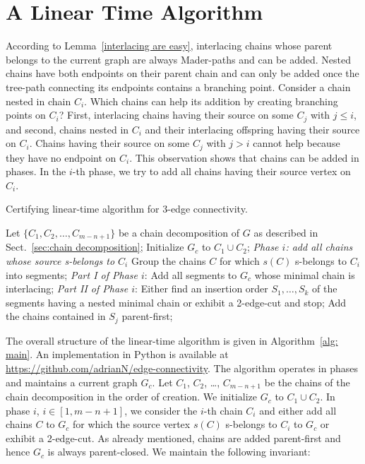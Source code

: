 \documentclass[paper=a4]{scrartcl}
\begin{document}
\section{A Linear Time Algorithm}\label{sec:linear time alg}


According to Lemma~\ref{interlacing are easy}, interlacing chains whose parent belongs to the current graph are always Mader-paths and can be added. Nested chains have both endpoints on their parent chain and can only be added once the tree-path connecting its endpoints contains a branching point. Consider a chain nested in chain $C_i$. Which chains can help its addition by creating branching points on $C_i$? First,  interlacing chains having their source on some $C_j$ with $j \le i$, and second, chains nested in $C_i$ and their interlacing offspring having  their source on $C_i$. Chains having their source on some $C_j$ with $j > i$ cannot help because they have no endpoint on $C_i$. This observation shows that chains can be added in phases. In the $i$-th phase, we try to add all chains having their source vertex on $C_i$.







\begin{algorithm}[t]
\caption{Certifying linear-time algorithm for 3-edge connectivity.}\label{alg: main}
\begin{algorithmic}
\State Let $\{C_1,C_2,\ldots,C_{m-n+1}\}$ be a chain decomposition of $G$ as
described in Sect.~\ref{sec:chain decomposition};
\State Initialize $G_c$ to $C_1 \cup C_2$;
             \Comment \emph{Phase $i$: add all chains whose source s-belongs to $C_i$}
	\State Group the chains $C$ for which $s(C)$ s-belongs to $C_i$ into
        segments;
\State \emph{Part I of Phase $i$}: Add all segments to $G_c$ whose minimal chain is interlacing;
	\State \emph{Part II of Phase $i$}: Either find an insertion order $S_1,\ldots,S_k$ of the segments having a nested minimal chain or exhibit a 2-edge-cut and stop;
		\State Add the chains contained in $S_j$ parent-first;
	\EndFor
\EndFor
\EndProcedure
\end{algorithmic}
\end{algorithm}

The overall structure of the linear-time algorithm is given in Algorithm~\ref{alg: main}. An implementation in Python is available at \url{https://github.com/adrianN/edge-connectivity}. The algorithm operates in phases and maintains a current graph $G_c$. Let $C_1$, $C_2$, \ldots, $C_{m-n+1}$ be the chains of the chain decomposition in the order of creation. We initialize $G_c$ to $C_1 \cup C_2$. In phase $i$, $i \in [1,m-n+1]$, we consider the $i$-th chain $C_i$ and either add all chains $C$ to $G_c$ for which the source vertex $s(C)$ s-belongs to $C_i$ to $G_c$ or exhibit a 2-edge-cut. As already mentioned, chains are added parent-first and hence $G_c$ is always parent-closed. We maintain the following invariant:\smallskip
\end{document}
